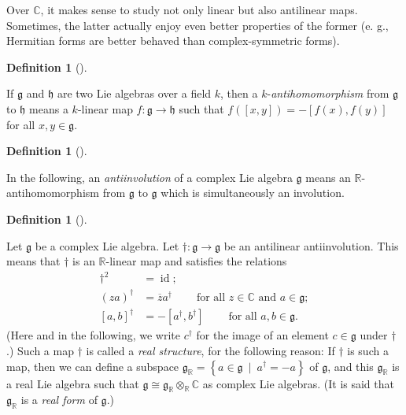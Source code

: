 \documentclass
[numbers=enddot,12pt,final,onecolumn,german,notitlepage]{scrartcl}%
\theoremstyle{definition}
\newtheorem{defi}[theo]{Definition}
\newenvironment{definition}[1][]
{\begin{defi}[#1]\begin{leftbar}}
{\end{leftbar}\end{defi}}
\begin{document}
Over $\mathbb{C}$, it makes sense to study not only linear but also antilinear
maps. Sometimes, the latter actually enjoy even better properties of the
former (e. g., Hermitian forms are better behaved than complex-symmetric forms).

\begin{definition}
If $\mathfrak{g}$ and $\mathfrak{h}$ are two Lie algebras over a field $k$,
then a $k$-\textit{antihomomorphism} from $\mathfrak{g}$ to $\mathfrak{h}$
means a $k$-linear map $f:\mathfrak{g}\rightarrow\mathfrak{h}$ such that
$f\left(  \left[  x,y\right]  \right)  =-\left[  f\left(  x\right)  ,f\left(
y\right)  \right]  $ for all $x,y\in\mathfrak{g}$.
\end{definition}

\begin{definition}
In the following, an \textit{antiinvolution} of a complex Lie algebra
$\mathfrak{g}$ means an $\mathbb{R}$-antihomomorphism from $\mathfrak{g}$ to
$\mathfrak{g}$ which is simultaneously an involution.
\end{definition}

\begin{definition}
Let $\mathfrak{g}$ be a complex Lie algebra. Let $\dag:\mathfrak{g}%
\rightarrow\mathfrak{g}$ be an antilinear antiinvolution. This means that
$\dag$ is an $\mathbb{R}$-linear map and satisfies the relations%
\begin{align*}
\dag^{2}  &  =\operatorname*{id};\\
\left(  za\right)  ^{\dag}  &  =\overline{z}a^{\dag}%
\ \ \ \ \ \ \ \ \ \ \text{for all }z\in\mathbb{C}\text{ and }a\in
\mathfrak{g};\\
\left[  a,b\right]  ^{\dag}  &  =-\left[  a^{\dag},b^{\dag}\right]
\ \ \ \ \ \ \ \ \ \ \text{for all }a,b\in\mathfrak{g}.
\end{align*}
(Here and in the following, we write $c^{\dag}$ for the image of an element
$c\in\mathfrak{g}$ under $\dag$.) Such a map $\dag$ is called a \textit{real
structure}, for the following reason: If $\dag$ is such a map, then we can
define a subspace $\mathfrak{g}_{\mathbb{R}}=\left\{  a\in\mathfrak{g}%
\ \mid\ a^{\dag}=-a\right\}  $ of $\mathfrak{g}$, and this $\mathfrak{g}%
_{\mathbb{R}}$ is a real Lie algebra such that $\mathfrak{g}\cong%
\mathfrak{g}_{\mathbb{R}}\otimes_{\mathbb{R}}\mathbb{C}$ as complex Lie
algebras. (It is said that $\mathfrak{g}_{\mathbb{R}}$ is a \textit{real form}
of $\mathfrak{g}$.)
\end{definition}
\end{document}
